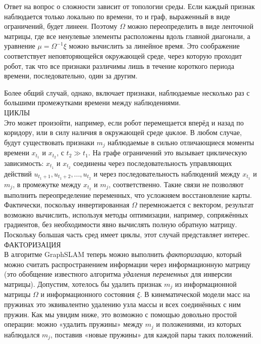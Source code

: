 \documentclass[10pt,a4paper]{article}
\begin{document}
Ответ на вопрос о сложности зависит от топологии среды. Если каждый признак наблюдается только локально по времени, то и граф, выраженный в виде ограничений, будет линеен. Поэтому $\varOmega$ можно переопределить в виде ленточной матрицы, где все ненулевые элементы расположены вдоль главной диагонали, а уравнение $\mu=\varOmega^{-1}\xi$ можно вычислить за линейное время. Это соображение соответствует неповторяющейся окружающей среде, через которую проходит робот, так что все признаки различимы лишь в течение короткого периода времени, последовательно, один за другим.

Более общий случай, однако, включает признаки, наблюдаемые несколько раз с большими промежутками времени между наблюдениями.\\
ЦИКЛЫ\\
Это может произойти, например, если робот перемещается вперёд и назад по коридору, или в силу наличия в окружающей среде \textit{циклов}. В любом случае, будут существовать признаки $m_j$ наблюдаемые в сильно отличающиеся моменты времени $x_{t_1}$ и $x_{t_2}$, с $t_2\gg t_1$. На графе ограничений это вызывает циклическую зависимость: $x_{t_1}$ и $x_{t_2}$ соединены через последовательность управляющих действий $u_{t_1+1}, u_{t_1+2},..., u_{t_2}$ и через последовательность наблюдений между $x_{t_1}$ и $m_j$, в промежутке  между $x_{t_2}$ и $m_j$, соответственно. Такие связи не позволяют выполнить переопределение переменных, что усложняем восстановление карты. Фактически, поскольку инвертированная $\varOmega$ перемножается с вектором, результат возможно вычислить, используя методы оптимизации, например, сопряжённых градиентов, без необходимости явно вычислять полную обратную матрицу. Поскольку большая часть сред имеет циклы, этот случай представляет интерес.\\

ФАКТОРИЗАЦИЯ\\

В алгоритме GraphSLAM теперь можно выполнить \textit{факторизацию}, который можно считать распространением информации через информационную матрицу (это обобщение известного алгоритма \textit{удаления переменных} для инверсии матрицы). Допустим, хотелось бы удалить признак $m_j$ из информационной матрицы $\varOmega$ и информационного состояния $\xi$. В кинематической модели масс на пружинах это эквивалентно удалению узла массы и всех соединённых с ним пружин. Как мы увидим ниже, это возможно с помощью довольно простой операции: можно «удалить пружины» между $m_j$ и положениями, из которых наблюдался $m_j$, поставив «новые пружины» для каждой пары таких положений.
\end{document}

